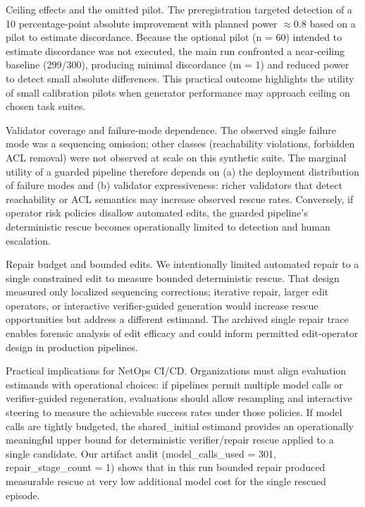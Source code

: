 \documentclass[conference]{IEEEtran}
\begin{document}
Ceiling effects and the omitted pilot. The preregistration targeted detection of a 10 percentage‑point absolute improvement with planned power \ensuremath{\approx}0.8 based on a pilot to estimate discordance. Because the optional pilot (n = 60) intended to estimate discordance was not executed, the main run confronted a near‑ceiling baseline (299/300), producing minimal discordance (m = 1) and reduced power to detect small absolute differences. This practical outcome highlights the utility of small calibration pilots when generator performance may approach ceiling on chosen task suites.

Validator coverage and failure‑mode dependence. The observed single failure mode was a sequencing omission; other classes (reachability violations, forbidden ACL removal) were not observed at scale on this synthetic suite. The marginal utility of a guarded pipeline therefore depends on (a) the deployment distribution of failure modes and (b) validator expressiveness: richer validators that detect reachability or ACL semantics may increase observed rescue rates. Conversely, if operator risk policies disallow automated edits, the guarded pipeline's deterministic rescue becomes operationally limited to detection and human escalation.

Repair budget and bounded edits. We intentionally limited automated repair to a single constrained edit to measure bounded deterministic rescue. That design measured only localized sequencing corrections; iterative repair, larger edit operators, or interactive verifier‑guided generation would increase rescue opportunities but address a different estimand. The archived single repair trace enables forensic analysis of edit efficacy and could inform permitted edit‑operator design in production pipelines.

Practical implications for NetOps CI/CD. Organizations must align evaluation estimands with operational choices: if pipelines permit multiple model calls or verifier‑guided regeneration, evaluations should allow resampling and interactive steering to measure the achievable success rates under those policies. If model calls are tightly budgeted, the shared\_initial estimand provides an operationally meaningful upper bound for deterministic verifier/repair rescue applied to a single candidate. Our artifact audit (model\_calls\_used = 301, repair\_stage\_count = 1) shows that in this run bounded repair produced measurable rescue at very low additional model cost for the single rescued episode.
\end{document}
